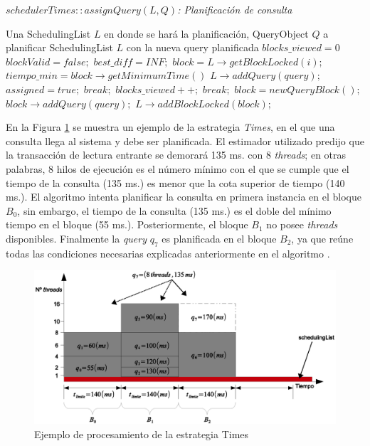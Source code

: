 \begin{algorithm}[!th]
\caption{\em $schedulerTimes::assignQuery(L, Q)$: Planificación de consulta}
\label{alg:times}
\begin{algorithmic}[1]
\REQUIRE Una SchedulingList $L$ en donde se hará la planificación, QueryObject $Q$ a planificar
\ENSURE SchedulingList $L$ con la nueva query planificada	
	\STATE $blocks\_viewed = 0$
	\STATE $blockValid = false;$	
	\STATE $best\_diff = INF;$	
		\STATE $block = L \rightarrow getBlockLocked(i);$		
			\STATE $tiempo\_min = block \rightarrow getMinimumTime()$			
				\STATE $L \rightarrow addQuery(query);$
				\STATE $assigned = true;$
				\STATE $break;$
			\ENDIF						
			\STATE $blocks\_viewed++;$			
				\STATE $break;$
			\ENDIF			
		\ENDIF		
	\ENDFOR	
		\STATE $block = new QueryBlock();$
		\STATE $block \rightarrow addQuery(query);$
		\STATE $L \rightarrow addBlockLocked(block);$		
	\ENDIF	
\end{algorithmic}
\end{algorithm}

En la Figura \ref{fig:proceso_Times} se muestra un ejemplo de la estrategia \textit{Times}, en el que una consulta llega al sistema y debe ser planificada. El estimador utilizado predijo que la transacción de lectura entrante se demorará 135 ms. con 8 \textit{threads}; en otras palabras, 8 hilos de ejecución es el número mínimo con el que se cumple que el tiempo de la consulta (135 ms.) es menor que la cota superior de tiempo (140 ms.). El algoritmo intenta planificar la consulta en primera instancia en el bloque $B_0$, sin embargo, el tiempo de la consulta (135 ms.) es el doble del mínimo tiempo en el bloque (55 ms.). Posteriormente, el bloque $B_1$ no posee \textit{threads} disponibles. Finalmente la \textit{query} $q_7$ es planificada en el bloque $B_2$, ya que reúne todas las condiciones necesarias explicadas anteriormente en el algoritmo \label{alg:times}. 

\begin{figure}[!th]
\centering
\includegraphics[scale=.75]{images/proceso_Times.eps}
\caption{Ejemplo de procesamiento de la estrategia Times}
\label{fig:proceso_Times}
\end{figure} 

